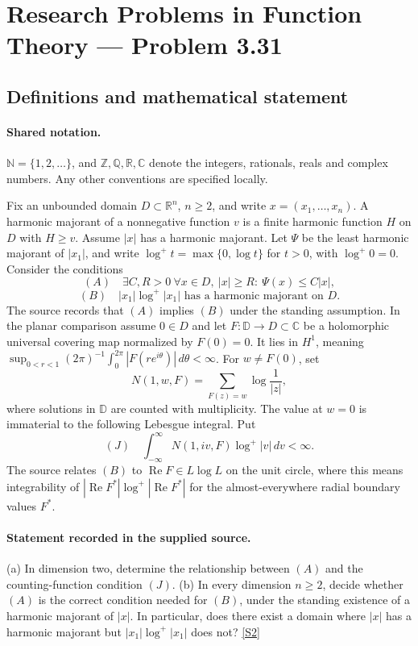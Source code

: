 \documentclass[11pt]{book}
\newcommand{\sref}[2]{\hyperlink{source:#1:#2}{[S#2]}}
\begin{document}
\section{Research Problems in Function Theory — Problem 3.31}\label{statement}

\subsection{Definitions and mathematical statement}

\paragraph{Shared notation.}$\mathbb N=\{1,2,\ldots\}$, and $\mathbb Z,\mathbb Q,\mathbb R,\mathbb C$ denote the integers, rationals, reals and complex numbers. Any other conventions are specified locally.


Fix an unbounded domain $D\subset\mathbb R^n$, $n\ge2$, and write $x=(x_1,\ldots,x_n)$. A harmonic majorant of a nonnegative function $v$ is a finite harmonic function $H$ on $D$ with $H\ge v$. Assume $|x|$ has a harmonic majorant. Let $\Psi$ be the least harmonic majorant of $|x_1|$, and write $\log^+t=\max\{0,\log t\}$ for $t>0$, with $\log^+0=0$. Consider the conditions
\[
 (A)\quad\exists C,R>0\ \forall x\in D,\ |x|\ge R:\ \Psi(x)\le C|x|,
\]
\[
 (B)\quad |x_1|\log^+|x_1|\text{ has a harmonic majorant on }D.
\]
The source records that $(A)$ implies $(B)$ under the standing assumption. In the planar comparison assume $0\in D$ and let $F:\mathbb D\to D\subset\mathbb C$ be a holomorphic universal covering map normalized by $F(0)=0$. It lies in $H^1$, meaning $\sup_{0<r<1}(2\pi)^{-1}\int_0^{2\pi}|F(re^{i\theta})|\,d\theta<\infty$. For $w\ne F(0)$, set
\[N(1,w,F)=\sum_{F(z)=w}\log\frac1{|z|},\]
where solutions in $\mathbb D$ are counted with multiplicity. The value at $w=0$ is immaterial to the following Lebesgue integral. Put
\[
 (J)\quad\int_{-\infty}^{\infty}N(1,iv,F)\log^+|v|\,dv<\infty.
\]
The source relates $(B)$ to $\operatorname{Re}F\in L\log L$ on the unit circle, where this means integrability of $|\operatorname{Re}F^*|\log^+|\operatorname{Re}F^*|$ for the almost-everywhere radial boundary values $F^*$.
\paragraph{Statement recorded in the supplied source.}
(a) In dimension two, determine the relationship between $(A)$ and the counting-function condition $(J)$.
(b) In every dimension $n\ge2$, decide whether $(A)$ is the correct condition needed for $(B)$, under the standing existence of a harmonic majorant of $|x|$. In particular, does there exist a domain where $|x|$ has a harmonic majorant but $|x_1|\log^+|x_1|$ does not? \sref{statement}{2}
\end{document}
